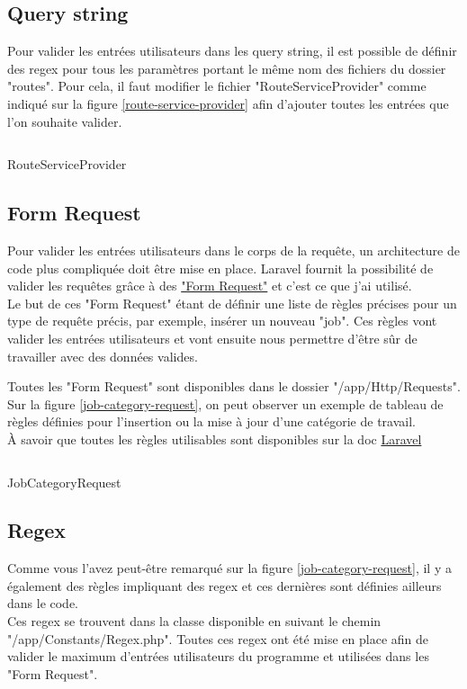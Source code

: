 \documentclass[
    iai, %
    il, %
]{heig-tb}
\begin{document}
\subsection{Query string}
Pour valider les entrées utilisateurs dans les query string, il est possible de définir des \Gls{regex} pour tous les paramètres portant le même nom des fichiers du dossier "routes".
Pour cela, il faut modifier le fichier "RouteServiceProvider" comme indiqué sur la figure \ref{route-service-provider} afin d'ajouter toutes les entrées que l'on souhaite valider.

\begin{listing}[h]
    \inputminted{php}{assets/code/RouteServiceProvider.php}
    \caption{RouteServiceProvider \label{route-service-provider}}
\end{listing}

\subsection{Form Request}
Pour valider les entrées utilisateurs dans le corps de la requête, un architecture de code plus compliquée doit être mise en place. Laravel fournit la possibilité de valider les requêtes grâce à des \href{https://laravel.com/docs/9.x/validation#form-request-validation}{"Form Request"} et c'est ce que j'ai utilisé. \\
Le but de ces "Form Request" étant de définir une liste de règles précises pour un type de requête précis, par exemple, insérer un nouveau "job". Ces règles vont valider les entrées utilisateurs et vont ensuite nous permettre d'être sûr de travailler avec des données valides.

Toutes les "Form Request" sont disponibles dans le dossier "/app/Http/Requests". \\
Sur la figure \ref{job-category-request}, on peut observer un exemple de tableau de règles définies pour l'insertion ou la mise à jour d'une catégorie de travail. \\
À savoir que toutes les règles utilisables sont disponibles sur la doc \href{https://laravel.com/docs/9.x/validation#available-validation-rules}{Laravel}

\begin{listing}[h]
    \inputminted{php}{assets/code/JobCategoryRequest.php}
    \caption{JobCategoryRequest \label{job-category-request}}
\end{listing}

\subsection{Regex}
Comme vous l'avez peut-être remarqué sur la figure \ref{job-category-request}, il y a également des règles impliquant des \Gls{regex} et ces dernières sont définies ailleurs dans le code. \\
Ces \Gls{regex} se trouvent dans la classe disponible en suivant le chemin "/app/Constants/Regex.php". Toutes ces \Gls{regex} ont été mise en place afin de valider le maximum d'entrées utilisateurs du programme et utilisées dans les "Form Request".
\end{document}
